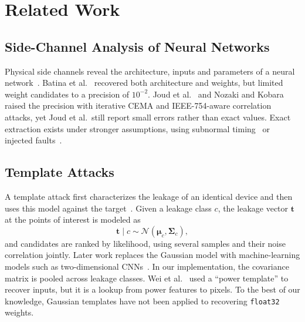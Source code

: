 \chapter{Related Work}
\label{chap:related}

\section{Side-Channel Analysis of Neural Networks}

Physical side channels reveal the architecture, inputs and parameters of a
neural network~\cite{horvath2024sok}. Batina et al.~\cite{batina2019csi}
recovered both architecture and weights, but limited weight candidates to a
precision of $10^{-2}$. Joud et al.~\cite{joud2022practical} and Nozaki and
Kobara~\cite{nozaki2024power} raised the precision with iterative CEMA and
IEEE-754-aware correlation attacks, yet Joud et al.\ still report small errors
rather than exact values. Exact extraction exists under stronger assumptions,
using subnormal timing~\cite{gongye2020floating} or injected
faults~\cite{breier2021sniff}.

\section{Template Attacks}

A template attack first characterizes the leakage of an identical device and
then uses this model against the target~\cite{chari2002template}. Given a
leakage class $c$, the leakage vector $\mathbf{t}$ at the points of interest is
modeled as
\begin{equation}
	\mathbf{t} \mid c \sim
	\mathcal{N}(\boldsymbol{\mu}_c,\boldsymbol{\Sigma}_c),
\end{equation}
and candidates are ranked by likelihood, using several samples and their noise
correlation jointly. Later work replaces the Gaussian model with machine-learning
models such as two-dimensional CNNs~\cite{tu2021template}. In our implementation, the
covariance matrix is pooled across leakage classes. Wei et
al.~\cite{wei2018iknow} used a ``power template'' to recover inputs, but it is
a lookup from power features to pixels. To the best of our knowledge, Gaussian
templates have not been applied to recovering \texttt{float32} weights.
